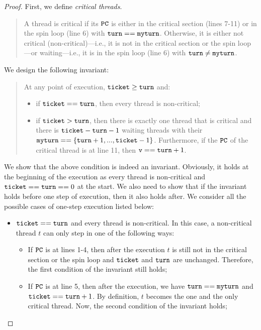 \documentclass{article}[10pt]
\newcommand{\kwd}[1]{\ensuremath{\text{\ttfamily #1}}\xspace}
\def\kv{\kwd{v}}
\def\kturn{\kwd{turn}}
\def\kmyturn{\kwd{myturn}}
\def\kticket{\kwd{ticket}}
\begin{document}
\begin{proof}
  First, we define \emph{critical threads}. 
  \begin{quote}
    A thread is critical if its \kwd{PC} is either in the critical
    section (lines 7-11) or in the spin loop (line 6) with $\kturn ==
    \kmyturn$. Otherwise, it is either not critical
    (non-critical)---i.e., it is not in the critical section or the
    spin loop---or waiting---i.e., it is in the spin loop (line 6)
    with $\kturn \not= \kmyturn$.
  \end{quote}
  We design the following invariant:
  \begin{quote}
    At any point of execution, $\kticket \geq \kturn$ and:
    \begin{itemize}
    \item if $\kticket == \kturn$, then every thread is non-critical;
    \item if $\kticket > \kturn$, then there is exactly one thread
      that is critical and there is $\kticket - \kturn - 1$ waiting
      threads with their $\kmyturn == \{\kturn+1,...,\kticket - 1\}$.
      Furthermore, if the \kwd{PC} of the critical thread is at line
      11, then $\kv == \kturn + 1$. 
    \end{itemize}
  \end{quote}
  We show that the above condition is indeed an
  invariant. Obviously, it holds at the beginning of the execution as
  every thread is non-critical and $\kticket == \kturn == 0$ at the
  start. We also need to show that if the invariant holds before one
  step of execution, then it also holds after. We consider all the
  possible cases of one-step execution listed below:
  \begin{itemize}
  \item $\kticket == \kturn$ and every thread is non-critical. In this
    case, a non-critical thread $t$ can only step in one of the
    following ways:
    \begin{itemize}
    \item If \kwd{PC} is at lines 1-4, then after the execution $t$ is
      still not in the critical section or the spin loop and \kticket
      and \kturn are unchanged. Therefore, the first condition of the
      invariant still holds;

    \item If \kwd{PC} is at line 5, then after the execution, we have
      $\kturn == \kmyturn$ and $\kticket == \kturn + 1$. By
      definition, $t$ becomes the one and the only critical
      thread. Now, the second condition of the invariant holds;


\end{itemize}
\end{itemize}
\end{proof}
\end{document}
